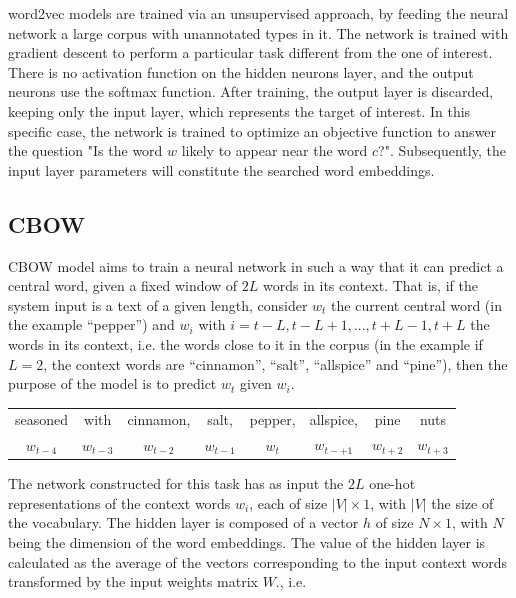 word2vec models are trained via an unsupervised approach, by feeding the neural network a large corpus with unannotated types in it. The network is trained with gradient descent to perform a particular task different from the one of interest. There is no activation function on the hidden neurons layer, and the output neurons use the softmax function. After training, the output layer is discarded, keeping only the input layer, which represents the target of interest. In this specific case, the network is trained to optimize an objective function to answer the question "Is the word $w$ likely to appear near the word $c$?". Subsequently, the input layer parameters will constitute the searched word embeddings.

\subsection{CBOW}

\ac{CBOW} model aims to train a neural network in such a way that it can predict a central word, given a fixed window of $2L$ words in its context. That is, if the system input is a text of a given length, consider $w_t$ the current central word (in the example “pepper”) and $w_i$ with $i = t - L, t - L + 1, ..., t + L - 1, t + L$ the words in its context, i.e. the words close to it in the corpus (in the example if $L = 2$, the context words are “cinnamon”, “salt”, “allspice” and “pine”), then the purpose of the model is to predict $w_t$ given $w_i$.

\begin{table}[!h]
\centering
\begin{tabular}{cccccccc}
seasoned & with & cinnamon, & salt, & pepper, & allspice, & pine & nuts \\
$w_{t-4}$ & $w_{t-3}$ & $w_{t-2}$ & $w_{t-1}$ & $w_{t}$ & $w_{t-+1}$ & $w_{t+2}$ & $w_{t+3}$
\end{tabular}
\end{table}



The network constructed for this task has as input the $2L$ one-hot representations of the context words $w_i$, each of size $|V| \times 1$, with $|V|$ the size of the vocabulary. The hidden layer is composed of a vector $h$ of size $N \times 1$, with $N$ being the dimension of the word embeddings. The value of the hidden layer is calculated as the average of the vectors corresponding to the input context words transformed by the input weights matrix $W$., i.e.

